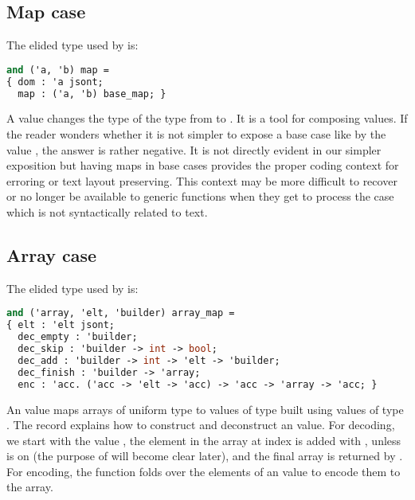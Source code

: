 \documentclass[nolinenum]{jfp}
\begin{document}
\subsection{Map case}
\label{sec:map_case}

The elided type  used by  is:
\begin{lstlisting}[language=ocaml]
and ('a, 'b) map =
{ dom : 'a jsont;
  map : ('a, 'b) base_map; }
\end{lstlisting}
%
A  value changes the \ml{}  type of the \json{} type
 from  to . It is a tool for composing
 values. If the reader wonders whether it is not simpler
to expose a base case like  by the value  , the answer is rather negative. It is not
directly evident in our simpler exposition but having maps in base
cases provides the proper coding context for erroring or text
layout preserving. This context may be more difficult to recover or no
longer be available to generic functions when they get to process the
 case which is not syntactically related to \json{} text.

\pagebreak

\subsection{Array case}
\label{sec:array_case}

The elided type  used by  is:
%
\begin{lstlisting}[language=ocaml]
and ('array, 'elt, 'builder) array_map =
{ elt : 'elt jsont;
  dec_empty : 'builder;
  dec_skip : 'builder -> int -> bool;
  dec_add : 'builder -> int -> 'elt -> 'builder;
  dec_finish : 'builder -> 'array;
  enc : 'acc. ('acc -> 'elt -> 'acc) -> 'acc -> 'array -> 'acc; }
\end{lstlisting}
%
An  value maps \json{} arrays of uniform \json{} type
 to values of type  built using values of
type . The record  explains how to construct
and deconstruct an  value. For decoding, we start with
the value , the element in the \json{} array at
index  is added with , unless
 is  on  (the purpose of
 will become clear later), and the final array is
returned by . For encoding, the 
function folds over the elements of an  value to encode
them to the \json{} array.
\end{document}
